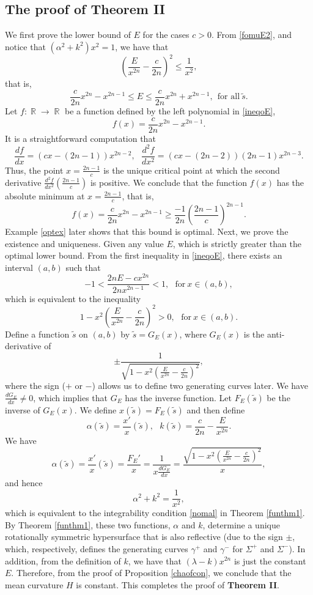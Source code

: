 \documentclass[12pt]{amsart}
\theoremstyle{definition}\newtheorem{exa}[thm]{\sc Example}
\theoremstyle{definition}\newtheorem{de}[thm]{\sc Definition}
\theoremstyle{definition}\newtheorem{rem}[thm]{\sc Remark}
\theoremstyle{definition}\newtheorem{prob}[thm]{\it Problem}
\theoremstyle{definition}\newtheorem{fact}[thm]{\sc Fact}
\theoremstyle{definition}\newtheorem{claim}[thm]{\sc Claim}
\numberwithin{equation}{section}
\DeclareMathOperator{\R}{\mathbb R}
\begin{document}
\subsection{The proof of {\bf Theorem II}}

We first prove the lower bound of $E$ for the cases $c>0$. From \eqref{fomuE2}, and notice that $(\alpha^{2}+k^{2})x^{2}=1$, we have that
\[\left(\frac{E}{x^{2n}}-\frac{c}{2n}\right)^{2}\leq\frac{1}{x^{2}},\]
that is,
\begin{equation}\label{ineqoE}
\frac{c}{2n}x^{2n}-x^{2n-1}\leq E\leq\frac{c}{2n}x^{2n}+x^{2n-1},\ \ \textrm{for all}\ \tilde{s}.
\end{equation}
Let $f:\R\rightarrow\R$ be a function defined by the left polynomial in \eqref{ineqoE},
\[f(x)=\frac{c}{2n}x^{2n}-x^{2n-1}.\]
It is a straightforward computation that
\[\frac{df}{dx}=(cx-(2n-1))x^{2n-2},\ \ \ \frac{d^{2}f}{dx^{2}}=(cx-(2n-2))(2n-1)x^{2n-3}.\]
Thus, the point $x=\frac{2n-1}{c}$ is the unique critical point at which the second derivative $\frac{d^{2}f}{dx^{2}}(\frac{2n-1}{c})$ is positive. We conclude that the function $f(x)$ has the absolute minimum at $x=\frac{2n-1}{c}$, that is,
\[f(x)=\frac{c}{2n}x^{2n}-x^{2n-1}\geq\frac{-1}{2n}\left(\frac{2n-1}{c}\right)^{2n-1}.\]
Example \ref{optex} later shows that this bound is optimal. Next, we prove the existence and uniqueness. Given any value $E$, which is strictly greater than the optimal lower bound. From the first inequality in \eqref{ineqoE}, there exists an interval $(a,b)$ such that
\[-1<\frac{2nE-cx^{2n}}{2nx^{2n-1}}<1,\ \ \ \textrm{for}\ x\in(a,b),\]
which is equivalent to the inequality
\[1-x^{2}\left(\frac{E}{x^{2n}}-\frac{c}{2n}\right)^{2}>0,\ \ \ \textrm{for}\ x\in(a,b).\]
Define a function $\tilde{s}$ on $(a,b)$ by $\tilde{s}=G_{E}(x)$, where $G_{E}(x)$ is the anti-derivative of 
\[\pm \frac{1}{\sqrt{1-x^{2}\left(\frac{E}{x^{2n}}-\frac{c}{2n}\right)^{2}}},\]
where the sign ($+$ or $-$) allows us to define two generating curves later. We have $\frac{dG_{E}}{dx}\neq 0$, which implies that $G_{E}$ has the inverse function. Let $F_{E}(\tilde{s})$ be the inverse of $G_{E}(x)$. We define $x(\tilde{s})=F_{E}(\tilde{s})$ and then define
\[\alpha(\tilde{s})=\frac{x'}{x}(\tilde{s}),\ \ \ k(\tilde{s})=\frac{c}{2n}-\frac{E}{x^{2n}}.\]
We have 
\[\alpha(\tilde{s})=\frac{x'}{x}(\tilde{s})=\frac{F_{E}'}{x}=\frac{1}{x\frac{dG_{E}}{dx}}=\frac{\sqrt{1-x^{2}\left(\frac{E}{x^{2n}}-\frac{c}{2n}\right)^{2}}}{x},\]
and hence
\[\alpha^{2}+k^{2}=\frac{1}{x^{2}},\]
which is equivalent to the integrability condition \eqref{nomal} in Theorem \ref{funthm1}. By Theorem \ref{funthm1}, these two functions, $\alpha$ and $k$, determine a unique rotationally symmetric hypersurface that is also reflective (due to the sign $\pm$, which, respectively, defines the generating curves $\gamma^{+}$ and $\gamma^{-}$ for $\Sigma^{+}$ and $\Sigma^{-}$).  In addition, from the definition of $k$, we have that $(\lambda-k)x^{2n}$ is just the constant $E$. Therefore, from the proof of Proposition \ref{chaofcon}, we conclude that the mean curvature $H$ is constant. This completes the proof of {\bf Theorem II}.
\end{document}
